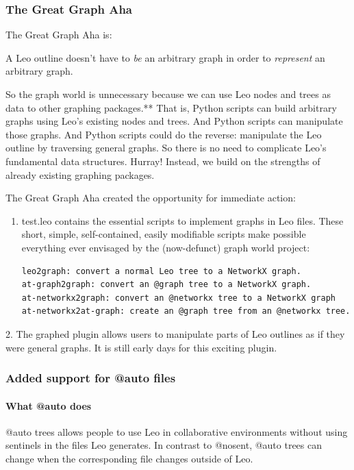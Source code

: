 \documentclass[a4paper,10pt,english]{sphinxmanual}
\begin{document}
\subsubsection{The Great Graph Aha}
\label{what-is-new:the-great-graph-aha}
The Great Graph Aha is:

A Leo outline doesn't have to \emph{be} an arbitrary graph in order to \emph{represent} an arbitrary graph.

So the graph world is unnecessary because we can use Leo nodes and trees as data
to other graphing packages.** That is, Python scripts can build arbitrary graphs
using Leo's existing nodes and trees. And Python scripts can manipulate those
graphs. And Python scripts could do the reverse: manipulate the Leo outline by
traversing general graphs. So there is no need to complicate Leo's fundamental
data structures. Hurray! Instead, we build on the strengths of already existing
graphing packages.

The Great Graph Aha created the opportunity for immediate action:
\begin{enumerate}
\item {} 
test.leo contains the essential scripts to implement graphs in Leo files.
These short, simple, self-contained, easily modifiable scripts make possible
everything ever envisaged by the (now-defunct) graph world project:

\begin{Verbatim}[commandchars=\\\{\}]
leo2graph: convert a normal Leo tree to a NetworkX graph.
at-graph2graph: convert an @graph tree to a NetworkX graph.
at-networkx2graph: convert an @networkx tree to a NetworkX graph
at-networkx2at-graph: create an @graph tree from an @networkx tree.
\end{Verbatim}

\end{enumerate}

2. The graphed plugin allows users to manipulate parts of Leo outlines as if
they were general graphs. It is still early days for this exciting plugin.


\subsubsection{Added support for @auto files}
\label{what-is-new:added-support-for-auto-files}

\paragraph{What @auto does}
\label{what-is-new:what-auto-does}
@auto trees allows people to use Leo in collaborative environments without using
sentinels in the files Leo generates. In contrast to @nosent, @auto trees can
change when the corresponding file changes outside of Leo.
\end{document}
